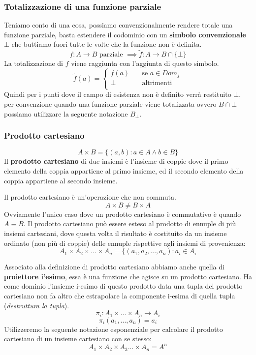 \documentclass{article}
\begin{document}
\subsubsection{Totalizzazione di una funzione parziale}
Teniamo conto di una cosa, possiamo convenzionalmente rendere totale una funzione parziale, basta estendere
il codominio con un \textbf{simbolo convenzionale} $\bot$ che buttiamo fuori tutte le volte che la funzione non è definita.
$$f:A\rightarrow B\text{ parziale } \implies \widetilde{f}:A\rightarrow B\cap\{\bot\}$$
La totalizzazione di $f$ viene raggiunta con l'aggiunta di questo simbolo.
\[
    \widetilde{f}(a) =
    \begin{cases}
        f(a) & \quad\text{se }a\in Dom_f \\
        \bot & \quad\text{altrimenti}    \\
    \end{cases}
\]
Quindi per i punti dove il campo di esistenza non è definito verrà restituito $\bot$, per convenzione
quando una funzione parziale viene totalizzata ovvero $B\cap\bot$ possiamo utilizzare la seguente
notazione $B_{\bot}$.

\subsubsection{Prodotto cartesiano}
$$A\times B=\{(a,b):a\in A \land b\in B\}$$
Il \textbf{prodotto cartesiano} di due insiemi è l'insieme di coppie dove il primo elemento della coppia appartiene al primo insieme, ed il secondo elemento della coppia appartiene al secondo insieme.

Il prodotto cartesiano è un'operazione che non commuta.
$$A\times B \neq B\times A$$
Ovviamente l'unico caso dove un prodotto cartesiano è commutativo è quando $A\equiv B$.
Il prodotto cartesiano può essere esteso al prodotto di ennuple di più insiemi cartesiani,
dove questa volta il risultato è costituito da un insieme ordinato (non più di coppie) delle ennuple
rispettive agli insiemi di provenienza:
$$A_1\times A_2 \times ... \times A_n=\{(a_1,a_2,...,a_n):a_i\in A_i$$

Associato alla definizione di prodotto cartesiano abbiamo anche quella di \textbf{proiettore i'esimo},
essa è una funzione che agisce su un prodotto cartesiano. Ha come dominio l'insieme i-esimo di questo prodotto data una tupla del prodotto cartesiano non fa altro che estrapolare la componente i-esima di quella tupla (\textit{destruttura la tupla}).
$$\pi_i:A_1\times ...\times A_n\rightarrow A_i$$
$$\pi_i(a_1,...,a_n)=a_i$$
Utilizzeremo la seguente notazione esponenziale per calcolare il prodotto cartesiano di un insieme cartesiano
con se stesso:
$$A_1\times A_2\times A_3 ... \times A_n = A^n$$
\end{document}
